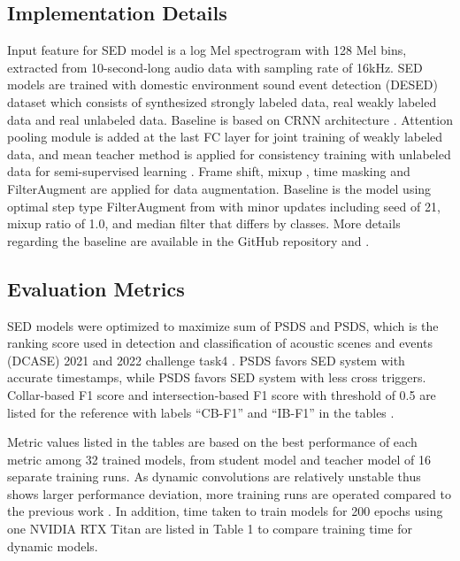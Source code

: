 \documentclass[a4paper]{article}
\begin{document}
\subsection{Implementation Details}
\vspace{-5pt}
Input feature for SED model is a log Mel spectrogram with 128 Mel bins, extracted from 10-second-long audio data with sampling rate of 16kHz. SED models are trained with domestic environment sound event detection (DESED) dataset \cite{DCASEtask4} which consists of synthesized strongly labeled data, real weakly labeled data and real unlabeled data. Baseline is based on CRNN architecture \cite{crnn}. Attention pooling module is added at the last FC layer for joint training of weakly labeled data, and mean teacher method is applied for consistency training with unlabeled data for semi-supervised learning \cite{meanteacher}. Frame shift, mixup \cite{mixup}, time masking \cite{specaug} and FilterAugment \cite{filtaug} are applied for data augmentation. Baseline is the model using optimal step type FilterAugment from \cite{filtaug} with minor updates including seed of 21, mixup ratio of 1.0, and median filter that differs by classes. More details regarding the baseline are available in the GitHub repository and \cite{filtaug, DCASEtask4, dcasebaseline, mytechreport}.

\subsection{Evaluation Metrics}
\vspace{-5pt}
SED models were optimized to maximize sum of PSDS and PSDS, which is the ranking score used in detection and classification of acoustic scenes and events (DCASE) 2021 and 2022 challenge task4 \cite{PSDS, dcasewebsite}. PSDS favors SED system with accurate timestamps, while PSDS favors SED system with less cross triggers. Collar-based F1 score and intersection-based F1 score with threshold of 0.5 are listed for the reference with labels “CB-F1” and “IB-F1” in the tables \cite{sedmetrics, insightdcase2020}.

Metric values listed in the tables are based on the best performance of each metric among 32 trained models, from student model and teacher model \cite{meanteacher} of 16 separate training runs. As dynamic convolutions are relatively unstable thus shows larger performance deviation, more training runs are operated compared to the previous work \cite{filtaug}. In addition, time taken to train models for 200 epochs using one NVIDIA RTX Titan are listed in Table 1 to compare training time for dynamic models. 
\end{document}
